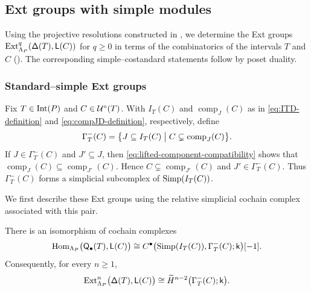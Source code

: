\subsection{Ext groups with simple modules}
\label{sec:standard-simple-extensions}


Using the projective resolutions constructed in
, we determine the Ext groups
$\operatorname{Ext}^q_{\Lambda_P}(\mathsf\Delta(T),\mathsf L(C))$ for $q\geq0$ in terms of the
combinatorics of the intervals $T$ and $C$
().
The corresponding simple--costandard statements follow by
poset duality.

\subsubsection{Standard--simple Ext groups}
\label{subsec:standard-simple-ext-groups}

Fix $T\in\operatorname{Int}(P)$ and $C\in\mathcal U^\circ(T)$.
With $I_T(C)$ and
$\operatorname{comp}_J(C)$ as in
\eqref{eq:ITD-definition} and \eqref{eq:compJD-definition},
respectively, define
\begin{equation}
\label{eq:Gamma-definition}
\Gamma_T^-(C)
=
\bigl\{
J\subseteq I_T(C)
\bigm|
C\subsetneq\operatorname{comp}_J(C)
\bigr\}.
\end{equation}
If $J\in\Gamma_T^-(C)$ and $J'\subseteq J$, then
\eqref{eq:lifted-component-compatibility} shows that
$\operatorname{comp}_J(C)\subseteq \operatorname{comp}_{J'}(C)$. 
Hence $C\subsetneq\operatorname{comp}_{J'}(C)$ and $J'\in \Gamma_T^-(C)$. 
Thus
$\Gamma_T^-(C)$ forms a simplicial subcomplex of
$\operatorname{Simp}(I_T(C))$.

We first describe these Ext groups using the relative simplicial
cochain complex associated with this pair.

\begin{proposition}
\label{prop:Gamma-relative-cochain}
There is an isomorphism of cochain complexes
\begin{equation}
\label{eq:Gamma-relative-cochain-complex}
\operatorname{Hom}_{\Lambda_P}\bigl(\mathsf Q_\bullet(T),\mathsf L(C)\bigr)
\cong
C^\bullet
\bigl(\operatorname{Simp}(I_T(C)),\Gamma_T^-(C);\mathsf{k}\bigr)[-1].
\end{equation}
Consequently, for every $n\geq1$,
\begin{equation}
\label{eq:Gamma-Ext-formula}
\operatorname{Ext}_{\Lambda_P}^n\bigl(\mathsf\Delta(T),\mathsf L(C)\bigr)
\cong
\widetilde H^{n-2}\bigl(\Gamma_T^-(C);\mathsf{k}\bigr).
\end{equation}
\end{proposition}

